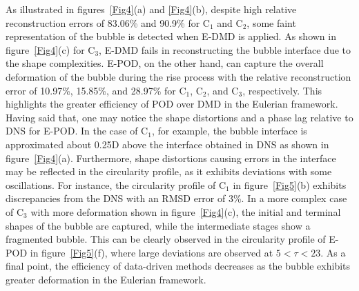 \documentclass[a4paper,fleqn]{cas-sc}
\begin{document}
	As illustrated in figures~\ref{Fig4}(a) and \ref{Fig4}(b), despite high relative reconstruction errors of 83.06\% and 90.9\% for C$_1$ and C$_2$, some faint representation of the bubble is detected when E-DMD is applied. As shown in figure~\ref{Fig4}(c) for C$_3$, E-DMD fails in reconstructing the bubble interface due to the shape complexities. E-POD, on the other hand, can capture the overall deformation of the bubble during the rise process with the relative reconstruction error of 10.97\%, 15.85\%, and 28.97\% for C$_1$, C$_2$, and C$_3$, respectively. This highlights the greater efficiency of POD over DMD in the Eulerian framework. Having said that, one may notice the shape distortions and a phase lag relative to DNS for E-POD. In the case of C$_1$, for example, the bubble interface is approximated about 0.25D above the interface obtained in DNS as shown in figure~\ref{Fig4}(a). Furthermore, shape distortions causing errors in the interface may be reflected in the circularity profile, as it exhibits deviations with some oscillations. For instance, the circularity profile of C$_1$ in figure~\ref{Fig5}(b) exhibits discrepancies from the DNS with an RMSD error of 3\%. In a more complex case of C$_3$ with more deformation shown in figure~\ref{Fig4}(c), the initial and terminal shapes of the bubble are captured, while the intermediate stages show a fragmented bubble. This can be clearly observed in the circularity profile of E-POD in figure~\ref{Fig5}(f), where large deviations are observed at $5 < \tau < 23$. As a final point, the efficiency of data-driven methods decreases as the bubble exhibits greater deformation in the Eulerian framework. 
	
\end{document}
